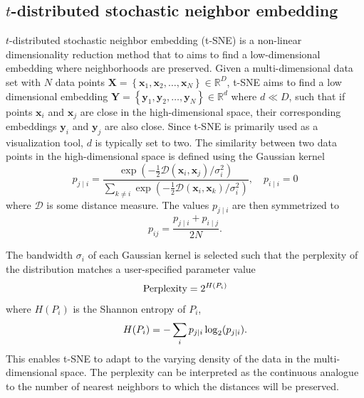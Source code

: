 \documentclass[article]{jss}
\begin{document}
\subsection{$t$-distributed stochastic neighbor embedding} \label{sec:meth.tsne}

$t$-distributed stochastic neighbor embedding (t-SNE) is a non-linear
dimensionality reduction method that to aims to find a low-dimensional embedding
where neighborhoods are preserved. Given a multi-dimensional data set with $N$ data points
$\mathbf{X} = \left \{ \mathbf{x}_1, \mathbf{x}_2, \dots, \mathbf{x}_N \right \}
\in \mathbb{R}^D$, t-SNE
aims to find a low dimensional embedding $\mathbf{Y} = \left \{ \mathbf{y}_1,
\mathbf{y}_2, \dots, \mathbf{y}_N \right\} \in \mathbb{R}^d$ where $d \ll D$,
such that if points $\mathbf{x}_i$ and $\mathbf{x}_j$ are close in the
high-dimensional space, their corresponding embeddings $\mathbf{y}_i$ and
$\mathbf{y}_j$ are also close. Since t-SNE is primarily used as a visualization
tool, $d$ is typically set to two. The similarity between two data points in the
high-dimensional space is defined using the Gaussian kernel
\begin{equation}
p_{j \mid i} = \frac{\exp \left ( -\frac{1}{2} \mathcal{D}(\mathbf{x}_i, \mathbf{x}_j ) / \sigma_i^2 \right )}
{\sum_{k \neq i } \exp \left ( -\frac{1}{2} \mathcal{D}(\mathbf{x}_i, \mathbf{x}_k ) / \sigma_i^2 \right )}, \quad p_{i \mid i} = 0
\label{eq:p_ij}
\end{equation}
where $\mathcal{D}$ is some distance measure. The values $p_{j \mid i}$
are then symmetrized to
\begin{equation}
p_{ij} = \frac{p_{j \mid i} + p_{i \mid j}}{2N}.
\label{eq:symmetrize}
\end{equation}

The bandwidth $\sigma_i$ of each Gaussian kernel is selected such that the perplexity of the distribution matches a user-specified parameter value
\begin{equation}
\text{Perplexity} = 2^{H(P_i)} \notag
\end{equation}
where $H(P_i)$ is the Shannon entropy of $P_i$,
\begin{equation}
H(P_i) = -\sum_i p_{j \mid i} \log_2 (p_{j \mid i}). \notag
\end{equation}
This enables t-SNE to adapt to the varying density of the data in the
multi-dimensional space. The perplexity can be interpreted as the continuous
analogue to the number of nearest neighbors to which the distances will be
preserved. 
\end{document}
